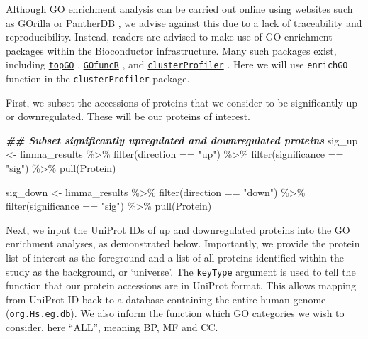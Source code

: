 \documentclass[9pt,a4paper,]{extarticle}
\newenvironment{Shaded}{\begin{snugshade}}{\end{snugshade}}
\newcommand{\DocumentationTok}[1]{\textcolor[rgb]{0.56,0.35,0.01}{\textbf{\textit{#1}}}}
\newcommand{\FunctionTok}[1]{\textcolor[rgb]{0.00,0.00,0.00}{#1}}
\newcommand{\NormalTok}[1]{#1}
\newcommand{\OtherTok}[1]{\textcolor[rgb]{0.56,0.35,0.01}{#1}}
\newcommand{\SpecialCharTok}[1]{\textcolor[rgb]{0.00,0.00,0.00}{#1}}
\newcommand{\StringTok}[1]{\textcolor[rgb]{0.31,0.60,0.02}{#1}}
\begin{document}
Although GO enrichment analysis can be carried out online using websites such
as \href{http://cbl-gorilla.cs.technion.ac.il}{GOrilla} \citep{Eden2009} or
\href{http://www.pantherdb.org}{PantherDB} \citep{Mi2012, Thomas2021}, we advise against
this due to a lack of traceability and reproducibility. Instead, readers are
advised to make use of GO enrichment packages within the Bioconductor
infrastructure. Many such packages exist, including \href{https://bioconductor.org/packages/release/bioc/html/topGO.html}{\texttt{topGO}} \citep{topGO},
\href{https://www.bioconductor.org/packages/release/bioc/html/GOfuncR.html}{\texttt{GOfuncR}} \citep{GofuncR},
and \href{https://bioconductor.org/packages/release/bioc/html/clusterProfiler.html}{\texttt{clusterProfiler}}
\citep{Wu2021}. Here we will use \texttt{enrichGO} function in the \texttt{clusterProfiler} package.

First, we subset the accessions of proteins that we consider to be significantly
up or downregulated. These will be our proteins of interest.

\begin{Shaded}
\begin{Highlighting}[]
\DocumentationTok{\#\# Subset significantly upregulated and downregulated  proteins}
\NormalTok{sig\_up }\OtherTok{\textless{}{-}}\NormalTok{ limma\_results }\SpecialCharTok{\%\textgreater{}\%}
  \FunctionTok{filter}\NormalTok{(direction }\SpecialCharTok{==} \StringTok{"up"}\NormalTok{) }\SpecialCharTok{\%\textgreater{}\%}
  \FunctionTok{filter}\NormalTok{(significance }\SpecialCharTok{==} \StringTok{"sig"}\NormalTok{) }\SpecialCharTok{\%\textgreater{}\%}
  \FunctionTok{pull}\NormalTok{(Protein)}

\NormalTok{sig\_down }\OtherTok{\textless{}{-}}\NormalTok{ limma\_results }\SpecialCharTok{\%\textgreater{}\%}
  \FunctionTok{filter}\NormalTok{(direction }\SpecialCharTok{==} \StringTok{"down"}\NormalTok{) }\SpecialCharTok{\%\textgreater{}\%}
  \FunctionTok{filter}\NormalTok{(significance }\SpecialCharTok{==} \StringTok{"sig"}\NormalTok{) }\SpecialCharTok{\%\textgreater{}\%}
  \FunctionTok{pull}\NormalTok{(Protein)}
\end{Highlighting}
\end{Shaded}

Next, we input the UniProt IDs of up and downregulated proteins into the GO
enrichment analyses, as demonstrated below. Importantly, we provide the protein
list of interest as the foreground and a list of all proteins identified within
the study as the background, or `universe'. The \texttt{keyType} argument is used to
tell the function that our protein accessions are in UniProt format. This allows
mapping from UniProt ID back to a database containing the entire human genome
(\texttt{org.Hs.eg.db}). We also inform the function which GO categories we wish to
consider, here ``ALL'', meaning BP, MF and CC.
\end{document}
